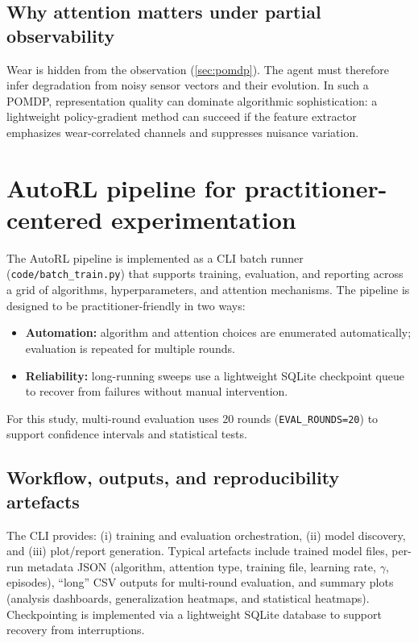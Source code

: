 \documentclass[11pt]{article}
\begin{document}
\subsection{Why attention matters under partial observability}
Wear is hidden from the observation (\cref{sec:pomdp}). The agent must therefore infer degradation from noisy sensor vectors and their evolution. In such a POMDP, representation quality can dominate algorithmic sophistication: a lightweight policy-gradient method can succeed if the feature extractor emphasizes wear-correlated channels and suppresses nuisance variation.

\section{AutoRL pipeline for practitioner-centered experimentation}
\label{sec:autorl}
The AutoRL pipeline is implemented as a CLI batch runner (\texttt{code/batch\_train.py}) that supports training, evaluation, and reporting across a grid of algorithms, hyperparameters, and attention mechanisms. The pipeline is designed to be practitioner-friendly in two ways:
\begin{itemize}
	\item \textbf{Automation:} algorithm and attention choices are enumerated automatically; evaluation is repeated for multiple rounds.
	\item \textbf{Reliability:} long-running sweeps use a lightweight SQLite checkpoint queue to recover from failures without manual intervention.
\end{itemize}
For this study, multi-round evaluation uses 20 rounds (\texttt{EVAL\_ROUNDS=20}) to support confidence intervals and statistical tests.

\subsection{Workflow, outputs, and reproducibility artefacts}
The CLI provides: (i) training and evaluation orchestration, (ii) model discovery, and (iii) plot/report generation. Typical artefacts include trained model files, per-run metadata JSON (algorithm, attention type, training file, learning rate, $\gamma$, episodes), ``long'' CSV outputs for multi-round evaluation, and summary plots (analysis dashboards, generalization heatmaps, and statistical heatmaps). Checkpointing is implemented via a lightweight SQLite database to support recovery from interruptions.
\end{document}
